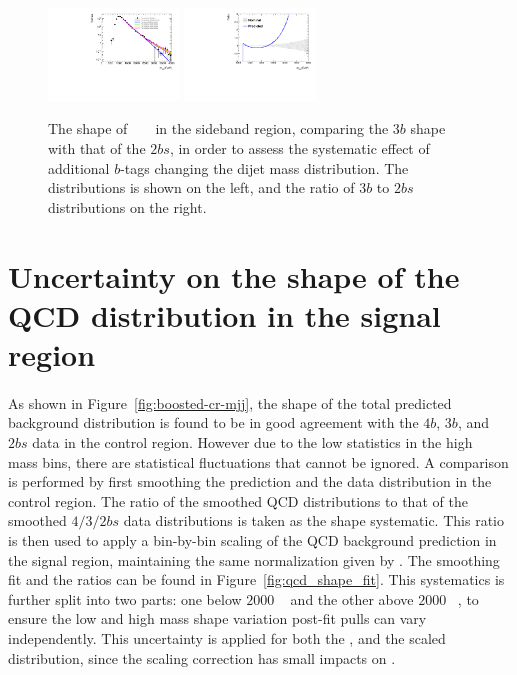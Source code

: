 \begin{figure}[htbp!]
\begin{center} 
\includegraphics[width=0.31\textwidth,angle=-90]{figures/boosted/Syst_Smooth/TopShapeSRSysfitSmooth_sig33_comp22.pdf}
\includegraphics[width=0.31\textwidth,angle=-90]{figures/boosted/Syst_Smooth/TopShapeSRSysfitSmooth_sig33_comp22_ratio.pdf}
\caption{The shape of \ttbar~ \mtwoJ~ in the sideband region,
comparing the $3b$ shape with that of the $2bs$, in order to assess the systematic effect of additional $b$-tags changing the dijet mass distribution.  The \mtwoJ~ distributions is shown on the left, and the ratio of $3b$ to $2bs$ distributions on the right.}
\label{fig:ttbar-shapes-signal}
\end{center}
\end{figure}


\section{Uncertainty on the shape of the QCD distribution in the signal region}
\label{unc-shape-qcd-in-sr}

\paragraph{}
As shown in Figure~\ref{fig:boosted-cr-mjj}, the shape of the total predicted background distribution is found to be in good agreement with the $4b$, $3b$, and $2bs$ data in the control region. 
However due to the low statistics in the high \mtwoJ~ mass bins, there are statistical fluctuations that cannot be ignored. 
A comparison is performed by first smoothing the prediction and the data distribution in the control region. 
The ratio of the smoothed QCD distributions to that of the smoothed $4/3/2bs$ data distributions is taken as the shape systematic. 
This ratio is then used to apply a bin-by-bin scaling of the QCD background prediction in the signal region, maintaining the same normalization given by \muqcd.  
The smoothing fit and the ratios can be found in Figure~\ref{fig:qcd_shape_fit}. 
This systematics is further split into two parts: one below $2000$ \GeV~ and the other above $2000$ \GeV~, to ensure the low and high mass shape variation post-fit pulls can vary independently.
This uncertainty is applied for both the \mtwoJ, and the scaled \mtwoJ~ distribution, since the scaling correction has small impacts on \mtwoJ. 

